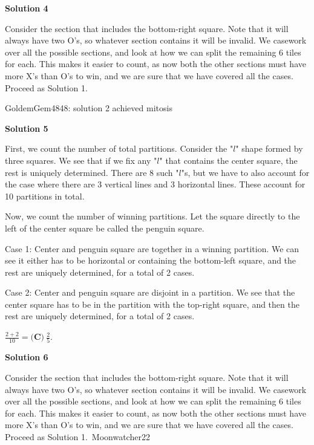 \begin{enumerate}
\textbf{Solution 4}

Consider the section that includes the bottom-right square. Note that it will always have two O's, so whatever section contains it will be invalid. We casework over all the possible sections, and look at how we can split the remaining 6 tiles for each. This makes it easier to count, as now both the other sections must have more X's than O's to win, and we are sure that we have covered all the cases. Proceed as Solution 1.

 GoldemGem4848: solution 2 achieved mitosis

 



\textbf{Solution 5}

First, we count the number of total partitions. Consider the "$l$" shape formed by three squares. We see that if we fix any "$l$" that contains the center square, the rest is uniquely determined. There are 8 such "$l$"s, but we have to also account for the case where there are 3 vertical lines and 3 horizontal lines. These account for 10 partitions in total.

 Now, we count the number of winning partitions. Let the square directly to the left of the center square be called the penguin square.

 Case 1: Center and penguin square are together in a winning partition. We can see it either has to be horizontal or containing the bottom-left square, and the rest are uniquely determined, for a total of 2 cases.

 Case 2: Center and penguin square are disjoint in a partition. We see that the center square has to be in the partition with the top-right square, and then the rest are uniquely determined, for a total of 2 cases.

 $\frac{2+2}{10} = \boxed{\textbf{(C)}~\frac{2}{5}}$.

 



\textbf{Solution 6}

Consider the section that includes the bottom-right square. Note that it will always have two O's, so whatever section contains it will be invalid. We casework over all the possible sections, and look at how we can split the remaining 6 tiles for each. This makes it easier to count, as now both the other sections must have more X's than O's to win, and we are sure that we have covered all the cases. Proceed as Solution 1.~Moonwatcher22

 




\end{enumerate}

